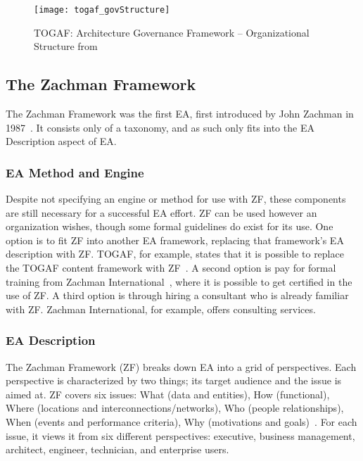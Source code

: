 \begin{figure}
\centering
\texttt{[image: togaf\_govStructure]}
\caption{TOGAF: Architecture Governance Framework -- Organizational Structure from \cite[Sec. 50.2.2.1]{togaf9.1}}
\label{fig:togaf_govStructure}
\end{figure}

\subsection{The Zachman Framework}

The Zachman Framework was the first EA, first introduced by John Zachman in 1987~\cite{sessions2007,zachman}. It consists only of a taxonomy, and as such only fits into the EA Description aspect of EA. 

\subsubsection{EA Method and Engine}

Despite not specifying an engine or method for use with ZF, these components are still necessary for a successful EA effort. ZF can be used however an organization wishes, though some formal guidelines do exist for its use. One option is to fit ZF into another EA framework, replacing that framework's EA description with ZF. TOGAF, for example, states that it is possible to replace the TOGAF content framework with ZF~\cite[Ch. 33]{togaf9.1}. A second option is pay for formal training from Zachman International~\cite{zachmanInc}, where it is possible to get certified in the use of ZF. A third option is through hiring a consultant who is already familiar with ZF. Zachman International, for example, offers consulting services.

\subsubsection{EA Description}

The Zachman Framework (ZF) breaks down EA into a grid of perspectives. Each perspective is characterized by two things; its target audience and the issue is aimed at. ZF covers six issues: What (data and entities), How (functional), Where (locations and interconnections/networks), Who (people relationships), When (events and performance criteria), Why (motivations and goals)~\cite{jungle2004}. For each issue, it views it from six different perspectives: executive, business management, architect, engineer, technician, and enterprise users. 

